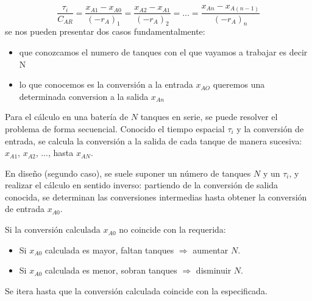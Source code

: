 \begin{equation}
	\frac{\tau_i}{C_{AR}} = \frac{x_{A1}-x_{A0}}{(-r_{A})_1} = \frac{x_{A2}-x_{A1}}{(-r_{A})_2} = \dots = \frac{x_{An}-x_{A(n-1)}}{(-r_{A})_n}
\end{equation}
\vspace{1em}
\noindent se nos pueden presentar dos casos fundamentalmente:
\begin{itemize}
	\item que conozcamos el numero de tanques con el que vayamos a trabajar es decir N
	\item lo que conocemos es la conversión a la entrada $x_{AO}$ queremos una determinada conversion a la salida $x_{An}$
\end{itemize}
\begin{flushleft}
	Para el cálculo en una batería de $N$ tanques en serie, se puede resolver el problema de forma secuencial. Conocido el tiempo espacial $\tau_i$ y la conversión de entrada, se calcula la conversión a la salida de cada tanque de manera sucesiva: $x_{A1}$, $x_{A2}$, ..., hasta $x_{AN}$.

	En diseño (segundo caso), se suele suponer un número de tanques $N$ y un $\tau_i$, y realizar el cálculo en sentido inverso: partiendo de la conversión de salida conocida, se determinan las conversiones intermedias hasta obtener la conversión de entrada $x_{A0}$.

	Si la conversión calculada $x_{A0}$ no coincide con la requerida:
	\begin{itemize}
		\item Si $x_{A0}$ calculada es mayor, faltan tanques $\Rightarrow$ aumentar $N$.
		\item Si $x_{A0}$ calculada es menor, sobran tanques $\Rightarrow$ disminuir $N$.
	\end{itemize}

	Se itera hasta que la conversión calculada coincide con la especificada.
\end{flushleft}




